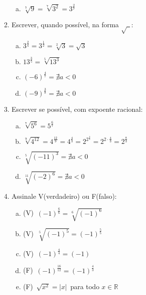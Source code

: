 \documentclass[a4paper,14pt]{article}
\begin{document}
\begin{multicols}{2}
\begin{enumerate}
\begin{enumerate}[a)]
        	\item $\sqrt[7]{9} = \sqrt[7]{3^2} = 3^\frac{2}{7}$ \\
        \end{enumerate}
        \item Escrever, quando possível, na forma $\sqrt{~~}$:
        \begin{enumerate}[a)] 
        	\item $3^\frac{2}{4} = 3^\frac{1}{2} = \sqrt[2]{3} = \sqrt{3}$\\
        	\item $13^\frac{3}{5} = \sqrt[5]{13^3}$ \\
        	\item $(-6)^\frac{4}{7} = \nexists a < 0$ \\
        	\item $(-9)^\frac{3}{8} = \nexists a < 0$ \\
        \end{enumerate}
        \item Escrever se possível, com expoente racional:
        \begin{enumerate}[a)]
        	\item $\sqrt[7]{5^6} = 5^\frac{6}{7}$ \\
        	\item $\sqrt[9]{4^{12}} = 4^\frac{12}{9} = 4^\frac{4}{3} = 2^{2^\frac{4}{3}} = 2^{2 \cdot \frac{4}{3}} = 2^\frac{8}{3}$ \\
        	\item $\sqrt[5]{(-11)^3} = \nexists a < 0$ \\
        	\item $\sqrt[11]{(-2)^6} = \nexists a < 0$ \\
        \end{enumerate}
        \item Assinale V(verdadeiro) ou F(falso):
        \begin{enumerate}[a)]
        	\item (V)~$(-1)^\frac{6}{6} = \sqrt[6]{(-1)^6}$\\
        	\item (V)~$\sqrt[5]{(-1)^5} = (-1)^\frac{5}{5}$ \\
        	\item (V)~$(-1)^\frac{4}{4} = (-1)$ \\
        	\item (F)~$(-1)^\frac{16}{12} = (-1)^\frac{4}{3}$ \\
        	\item (F)~$\sqrt{x^2} = |x|$~para todo $x \in \mathbb{R}$ \\

\end{enumerate}
\end{enumerate}
\end{multicols}
\end{document}
